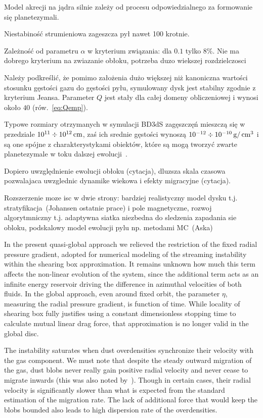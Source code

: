 Model akrecji na jądra silnie zależy od procesu odpowiedzialnego za formowanie
się planetezymali.


Niestabiność strumieniowa zageszcza pył nawet 100 krotnie.


Zależność od parametru $\alpha$ w kryterium związania: dla $0.1$ tylko $8\%$.
Nie ma dobrego kryterium na zwiazanie obłoku, potrzeba duzo wiekszej rozdzielczosci


Należy podkreślić, że pomimo założenia dużo większej niż kanoniczna wartości
stosunku gęstości gazu do gęstości pyłu, symulowany dysk jest stabilny zgodnie z
kryterium Jeansa.  Parameter $Q$ jest stały dla całej domeny obliczeniowej i
wynosi około $40$ (rów.~\ref{eq:Qemp}).

\par Typowe rozmiary otrzymanych w symulacji BD3dS zagęszczęń mieszczą się w
przedziale $10^{11} \div 10^{12}\hbox{$\thinspace\textrm{cm}$}$, zaś ich srednie gęstości wynoszą $10^{-12}
\div 10^{-10}\hbox{$\thinspace\textrm{g}$}/\hbox{$\thinspace\textrm{cm}$}^3$ i są one spójne z charakterystykami obiektów, które są
mogą tworzyć zwarte planetezymale w toku dalszej ewolucji~\cite{HS08}.

Dopiero uwzględnienie ewolucji obłoku (cytacja), dluzsza skala czasowa
pozwalajaca uwzglednic dynamike wiekowa i efekty migracyjne (cytacja).


Rozszerzenie moze isc w dwie strony: bardziej realistyczny model dysku t.j.
stratyfikacja~(Johansen ostatnie prace) i pole magnetyczne, rozwoj
algorytmniczny t.j. adaptywna siatka niezbedna do sledzenia zapadania sie
obloku, podskalowy model ewolucji pylu np.  metodami MC~(Aska)



\par In the present quasi-global approach we relieved the restriction of the
fixed  radial pressure gradient, adopted for numerical modeling of the streaming
instability within the shearing box approximation.  It remains unknown how much
this term affects the non-linear evolution of the system, since the additional
term acts as an infinite energy reservoir driving the difference in azimuthal
velocities of both fluids. In the global approach, even around fixed orbit, the
parameter $\eta$, measuring the radial pressure gradient, is function of time.
While locality of shearing box fully justifies using a constant dimensionless
stopping time to calculate mutual linear drag force, that approximation is no
longer valid in the global disc. 


\par The instability saturates when dust overdensities synchronize their
velocity with the gas component. We must note that despite the steady outward
migration of the gas, dust blobs never really gain positive radial velocity and
never cease to migrate inwards (this was also noted by~\cite{JY07}). Though in
certain cases, their radial velocity is significantly slower than what is
expected from the standard estimation of the migration rate. The lack of
additional force that would keep the blobs bounded also leads to high dispersion
rate of the overdensities.

